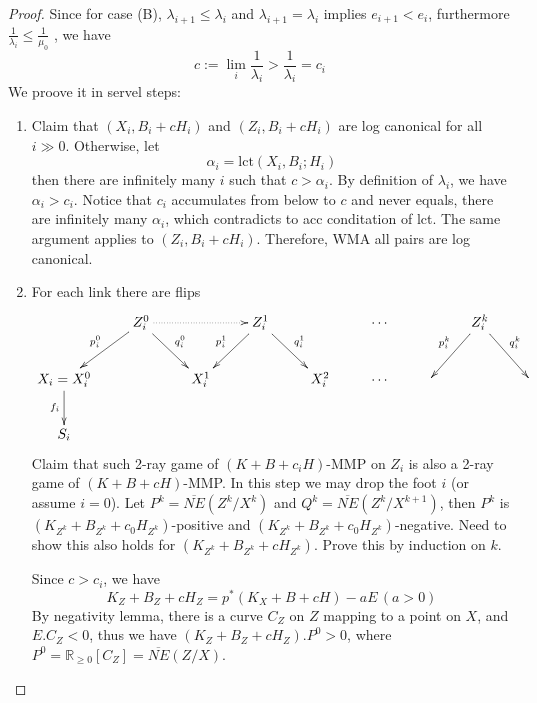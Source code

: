 \documentclass{article}
\begin{document}
\begin{proof}
  Since for case (B), $ \lambda_{i+1}\leqslant \lambda_i $ and $ \lambda_{i+1}=\lambda_i $ implies $ e_{i+1}<e_i $, furthermore $ \frac{1}{\lambda_i}\leqslant \frac{1}{\mu_0} $ , we have
  $$ c:=\lim_{i}\frac{1}{\lambda_i}>\frac{1}{\lambda_i}=c_i $$
  We proove it in servel steps:
  \begin{enumerate}[Step 1]
    \item Claim that $ (X_i,B_i+cH_i) $ and $ (Z_i,B_i+cH_i) $ are log canonical for all $ i\gg 0 $. Otherwise, let
    $$ \alpha_i=\mathrm{lct}(X_i,B_i;H_i) $$
    then there are infinitely many $ i $ such that $ c>\alpha_i $. By definition of $ \lambda_i $, we have $ \alpha_i>c_i $. Notice that $ c_i $ accumulates from below to $ c $ and never equals, there are infinitely many $ \alpha_i $, which contradicts to acc conditation of lct. The same argument applies to $ (Z_i,B_i+cH_i) $. Therefore, WMA all pairs are log canonical.
    \item For each link there are flips
    $$ \xymatrix{
      &Z_i^0\ar[ld]_{p^0_i}\ar[dr]^{q^0_i}\ar@{.>}[rr]&&Z_i^1\ar[ld]_{p^1_i}\ar[rd]^{q^1_i}&&\cdots&&Z_i^k\ar[ld]_{p^k_i}\ar[dr]^{q^k_i}\\
      X_i=X^0_i\ar[d]_{f_i} &&X^1_i&&X_i^2&\cdots&&&\\
      S_i }$$
    Claim that such 2-ray game of $ (K+B+c_iH) $-MMP on $ Z_i $ is also a 2-ray game of $ (K+B+cH) $-MMP. In this step we may drop the foot $ i $ (or assume $ i=0 $). Let $ P^k=\overline{NE}(Z^k/X^k) $ and $ Q^k=\overline{NE}(Z^k/X^{k+1}) $, then $ P^k $ is $ (K_{Z^k}+B_{Z^k}+c_0H_{Z^k}) $-positive and $ (K_{Z^k}+B_{Z^k}+c_0H_{Z^k}) $-negative. Need to show this also holds for $ (K_{Z^k}+B_{Z^k}+cH_{Z^k}) $. Prove this by induction on $ k $.
    
    Since $ c>c_i $, we have 
    $$ K_Z+B_Z+cH_Z=p^*(K_X+B+cH)-aE\,(a>0) $$
    By negativity lemma, there is a curve $ C_Z $ on $ Z $ mapping to a point on $ X $, and $ E.C_Z<0 $, thus we have $ (K_Z+B_Z+cH_Z).P^0>0 $, where $ P^0=\mathbb{R}_{\geqslant0}[C_Z]=\overline{NE}(Z/X) $.
    

\end{enumerate}
\end{proof}
\end{document}
